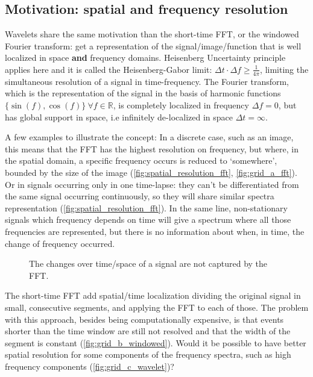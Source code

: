 \subsection{Motivation: spatial and frequency resolution}
\label{sub:Motivation}
Wavelets share the same motivation than the short-time FFT, or the windowed Fourier transform: get a representation of the signal/image/function that is well localized in space \textbf{and} frequency domains. Heisenberg Uncertainty principle applies here and it is called the Heisenberg-Gabor limit: $\Delta t \cdot \Delta f \geq \frac{1}{4\pi}$, limiting the simultaneous resolution of a signal in time-frequency.
The Fourier transform, which is the representation of the signal in the basis of harmonic functions $\{\sin(f),\cos(f)\}\ \forall f \in \mathbb{R}$, is completely localized in frequency $\Delta f = 0$, but has global support in space, i.e infinitely de-localized in space $\Delta t = \infty$.

A few examples to illustrate the concept: In a discrete case, such as an image, this means that the FFT has the highest resolution on frequency, but where, in the spatial domain, a specific frequency occurs is reduced to `somewhere', bounded by the size of the image (\autoref{fig:spatial_resolution_fft}, \ref{fig:grid_a_fft}).
Or in signals occurring only in one time-lapse: they can't be differentiated from the same signal occurring continuously, so they will share similar spectra representation (\autoref{fig:spatial_resolution_fft}). In the same line, non-stationary signals which frequency depends on time will give a spectrum where all those frequencies are represented, but there is no information about when, in time, the change of frequency occurred.
\begin{figure}[H]
  \centering
  \resizebox{0.9\textwidth}{!}{}
  \caption{The changes over time/space of a signal are not captured by the FFT.}
  \label{fig:spatial_resolution_fft}
\end{figure}

The short-time FFT add spatial/time localization dividing the original signal in small, consecutive segments, and applying the FFT to each of those. The problem with this approach, besides being computationally expensive, is that events shorter than the time window are still not resolved and that the width of the segment is constant (\autoref{fig:grid_b_windowed}). Would it be possible to have better spatial resolution for some components of the frequency spectra, such as high frequency components (\autoref{fig:grid_c_wavelet})?

